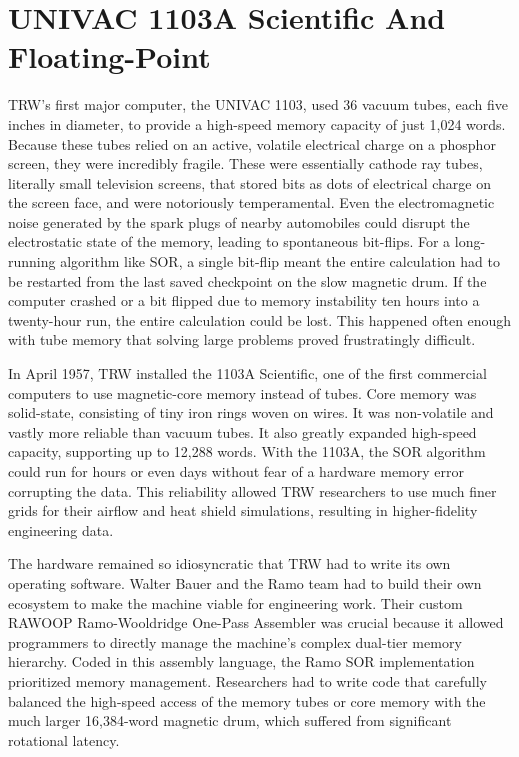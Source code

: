 \section{UNIVAC 1103A Scientific And Floating-Point}

TRW’s first major computer, the UNIVAC 1103, used 36 vacuum tubes, each five inches in diameter, to provide a high-speed memory capacity of just 1,024 words. Because these tubes relied on an active, volatile electrical charge on a phosphor screen, they were incredibly fragile.  These were essentially cathode ray tubes, literally small television screens, that stored bits as dots of electrical charge on the screen face, and were notoriously temperamental. Even the electromagnetic noise generated by the spark plugs of nearby automobiles could disrupt the electrostatic state of the memory, leading to spontaneous bit-flips. For a long-running algorithm like SOR, a single bit-flip meant the entire calculation had to be restarted from the last saved checkpoint on the slow magnetic drum. If the computer crashed or a bit flipped due to memory instability ten hours into a twenty-hour run, the entire calculation could be lost. This happened often enough with tube memory that solving large problems proved frustratingly difficult. 

In April 1957, TRW installed the 1103A Scientific, one of the first commercial computers to use magnetic-core memory instead of tubes. Core memory was solid-state, consisting of tiny iron rings woven on wires. It was non-volatile and vastly more reliable than vacuum tubes. It also greatly expanded high-speed capacity, supporting up to 12,288 words. With the 1103A, the SOR algorithm could run for hours or even days without fear of a hardware memory error corrupting the data. This reliability allowed TRW researchers to use much finer grids for their airflow and heat shield simulations, resulting in higher-fidelity engineering data. 

The hardware remained so idiosyncratic that TRW had to write its own operating software. Walter Bauer and the Ramo team had to build their own ecosystem to make the machine viable for engineering work. Their custom RAWOOP Ramo-Wooldridge One-Pass Assembler was crucial because it allowed programmers to directly manage the machine's complex dual-tier memory hierarchy. Coded in this assembly language, the Ramo SOR implementation prioritized memory management. Researchers had to write code that carefully balanced the high-speed access of the memory tubes or core memory with the much larger 16,384-word magnetic drum, which suffered from significant rotational latency. 


